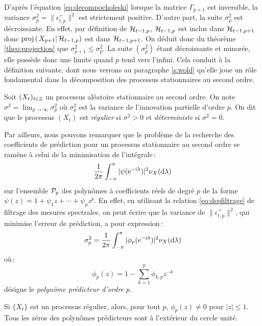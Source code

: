 D'apr\`es l'\'equation \eqref{eq:decompocholeski} lorsque la
matrice $\Gamma_{p+1}$ est inversible, la variance
$\sigma_p^2=\|\epsilon_{t,p}^+\|^2$ est strictement positive.
D'autre part, la suite $\sigma_p^2$ est
d\'ecroissante. En effet, par d\'efinition de $\mathcal{H}_{t-1,p}$,
$\mathcal{H}_{t-1,p}$ est inclus dans $\mathcal{H}_{t-1,p+1}$ donc
$\proj{X_{p+1}}{\cH_{t-1,p}}$ est dans $\mathcal{H}_{t-1,p+1}$.
On d\'eduit donc du th\'eor\`eme \ref{theo:projection} que $\sigma_{p+1}^2\leq\sigma_{p}^2$.
La suite $(\sigma_p^2)$ \'etant d\'ecroissante et minor\'ee, elle poss\`ede
donc une limite quand $p$ tend vers l'infini. Cela conduit \`a la d\'efinition suivante,
dont nous verrons au paragraphe \ref{s:wold} qu'elle joue un r\^ole
fondamental dans la d\'ecomposition des processus stationnaires au
second ordre.

\begin{definition}
 \label{def:paregulier}
 Soit $(X_t)_{t \in \mathbb{Z}}$ un processus al\'eatoire stationnaire au second
ordre. On note $\sigma^2=\lim_{p\to\infty}\sigma_p^2$ o\`u
$\sigma_p^2$ est la variance de l'innovation partielle
d'ordre $p$. On dit que le processus $(X_t)$ est \emph{r\'egulier} si
$\sigma^2 > 0$ et \emph{d\'eterministe} si $\sigma^2=0$.
\end{definition}


Par ailleurs, nous pouvons remarquer que le probl\`eme de la recherche des coefficients de pr\'ediction pour
un processus stationnaire au second ordre se ram\`ene \`a
celui de la minimisation de l'int\'egrale\,:
\[
   \frac{1}{2\pi}
             \int_{-\pi}^{\pi} |\psi(\mathrm{e}^{-\mathrm{i}\lambda})|^2 \nu_X(\mathrm{d}\lambda)
\]
sur l'ensemble $\mathcal{P}_p$ des polyn\^omes \`a coefficients r\'eels
de degr\'e $p$ de la forme $\psi(z) = 1 + \psi_1 z + \cdots + \psi_p
z^p$. En effet, en utilisant la relation \eqref{eq:dspfiltrage} de
filtrage des mesures spectrales, on peut \'ecrire que la variance de
$ \| \epsilon_{t,p}^+ \|^2$, qui minimise l'erreur de
pr\'ediction, a pour expression\,:
\begin{equation}
\label{eq:variance:innovation:partielle}
 \sigma_p^2
 = \frac{1}{2 \pi} \int_{-\pi}^{\pi} |
    \phi_p(\mathrm{e}^{-\mathrm{i}\lambda})|^2 \nu_X(\mathrm{d}\lambda)
\end{equation}
o\`u\,:
\[
  \phi_p(z) = 1 - \sum_{k=1}^p \phi_{k,p} z^{-k}
\]
d\'esigne le \emph{polyn\^ome pr\'edicteur d'ordre $p$}.
\begin{theorem}
 \label{theo:procregulpredicstable}
 Si $\{ X_t \}$ est un processus r\'egulier, alors, pour
tout $p$, $\phi_p(z) \ne 0$ pour $|z|\leq 1$. Tous les z\'eros des
polyn\^omes pr\'edicteurs sont \`a l'ext\'erieur du cercle unit\'e.
\end{theorem}

